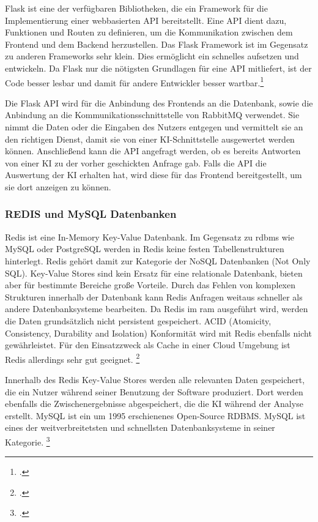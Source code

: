 Flask ist eine der verfügbaren Bibliotheken, die ein Framework für die Implementierung einer webbasierten API bereitstellt. Eine API dient dazu, Funktionen und Routen zu definieren, um die Kommunikation zwischen dem Frontend und dem Backend herzustellen. Das Flask Framework ist im Gegensatz zu anderen Frameworks sehr klein. Dies ermöglicht ein schnelles aufsetzen und entwickeln. Da Flask nur die nötigsten Grundlagen für eine API mitliefert, ist der Code besser lesbar und damit für andere Entwickler besser wartbar.\footcite{grinberg2018flask} 

Die Flask API wird für die Anbindung des Frontends an die Datenbank, sowie die Anbindung an die Kommunikationsschnittstelle von RabbitMQ verwendet. Sie nimmt die Daten oder die Eingaben des Nutzers entgegen und vermittelt sie an den richtigen Dienst, damit sie von einer KI-Schnittstelle ausgewertet werden können. Anschließend kann die API angefragt werden, ob es bereits Antworten von einer KI zu der vorher geschickten Anfrage gab. Falls die API die Auswertung der KI erhalten hat, wird diese für das Frontend bereitgestellt, um sie dort anzeigen zu können.  

\subsubsection{REDIS und MySQL Datenbanken}
Redis ist eine In-Memory Key-Value Datenbank. Im Gegensatz zu  \ac{rdbms} wie MySQL oder PostgreSQL werden in Redis keine festen Tabellenstrukturen hinterlegt. Redis gehört damit zur Kategorie der NoSQL Datenbanken (Not Only SQL). Key-Value Stores sind kein Ersatz für eine relationale Datenbank, bieten aber für bestimmte Bereiche große Vorteile. Durch das Fehlen von komplexen Strukturen innerhalb der Datenbank kann Redis Anfragen weitaus schneller als andere Datenbanksysteme bearbeiten. Da Redis im \ac{ram} ausgeführt wird,  werden die Daten grundsätzlich nicht persistent gespeichert. ACID (Atomicity, Consistency, Durability and Isolation) Konformität wird mit Redis ebenfalls nicht gewährleistet. Für den Einsatzzweck als Cache in einer Cloud Umgebung ist Redis allerdings sehr gut geeignet. \footcite{paksula2010persisting}

Innerhalb des Redis Key-Value Stores werden alle relevanten Daten gespeichert, die ein Nutzer während seiner Benutzung der Software produziert. Dort werden ebenfalls die Zwischenergebnisse abgespeichert, die die KI während der Analyse erstellt.
%
MySQL ist ein um 1995 erschienenes Open-Source RDBMS. MySQL ist eines der weitverbreitetsten und schnellsten Datenbanksysteme in seiner Kategorie. \footcite{dubois2008mysql}

